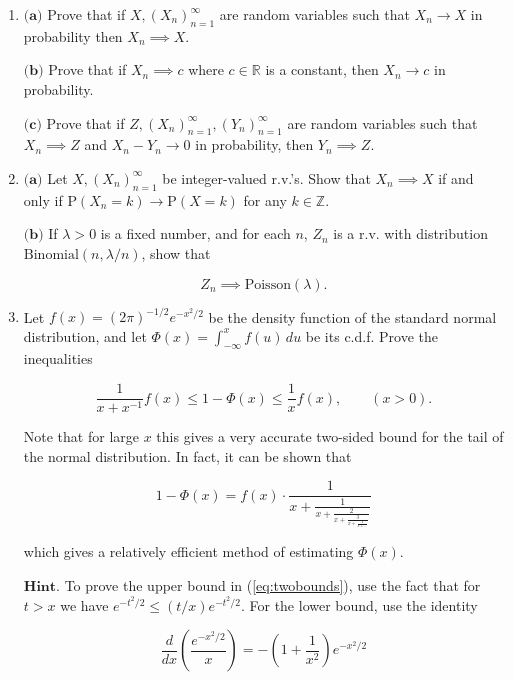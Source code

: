 \documentclass[11pt]{report}
\newcommand{\R}{\mathbb{R}}
\newcommand{\Z}{\mathbb{Z}}
\theoremstyle{plain}
\theoremstyle{definition}
\begin{document}
\begin{enumerate}[label=\arabic*.]
\[
f_{\phi(U,V)}(w,z) = \frac{1}{|J_\phi(\phi^{-1}(w,z))|} f_{U,V}(\phi^{-1}(w,z))
\]

for the density of a transformed random $2$-d vector
to get the joint density of $W,Z$.

\item $\textbf{(a)}$ Prove that if $X, (X_n)_{n=1}^\infty$
are random variables such that $X_n \to X$ in
probability then $X_n \implies X$.

$\textbf{(b)}$ Prove that if $X_n \implies c$ where
$c\in \R$ is a constant, then $X_n \to c$ in
probability.

$\textbf{(c)}$ Prove that if
$Z, (X_n)_{n=1}^\infty, (Y_n)_{n=1}^\infty$ are
random variables such that $X_n \implies Z$ and
$X_n-Y_n\to 0$ in probability, then $Y_n \implies Z$.

\item $\textbf{(a)}$ Let $X, (X_n)_{n=1}^\infty$ be
integer-valued r.v.'s. Show that $X_n\implies X$ if
and only if $\mathrm{P}(X_n=k)\to \mathrm{P}(X=k)$
for any $k\in\Z$.

$\textbf{(b)}$ If $\lambda >0$ is a fixed number, and
for each $n$, $Z_n$ is a r.v. with distribution
$\textrm{Binomial}(n,\lambda/n)$, show that

\[
Z_n \implies \textrm{Poisson}(\lambda).
\]

\item Let $f(x) = (2\pi)^{-1/2} e^{-x^2/2}$ be the density
function of the standard normal distribution, and let
$\Phi(x) = \int_{-\infty}^x f(u)\,du$ be its c.d.f.
Prove the inequalities

\begin{equation*}
\tag{38}\label{eq:twobounds}
\frac{1}{x+x^{-1}}f(x) \le 1-\Phi(x) \le \frac{1}{x} f(x), \qquad (x>0).
\end{equation*}

Note that for large $x$ this gives a very accurate
two-sided bound for the tail of the normal
distribution. In fact, it can be shown that

\[
1-\Phi(x) = f(x) \cdot \frac{1}{x+\frac{1}{x+\frac{2}{x+\frac{3}{x+\frac{4}{x+\ldots}}}}}
\]

which gives a relatively efficient method of
estimating $\Phi(x)$.

$\textbf{Hint.}$ To prove the upper bound in
(\ref{eq:twobounds}), use the fact that for $t>x$ we have
$e^{-t^2/2} \le (t/x)e^{-t^2/2}$. For the lower
bound, use the identity

\[
\frac{d}{dx}\left(\frac{e^{-x^2/2}}{x}\right) = -\left(1+\frac{1}{x^2}\right) e^{-x^2/2}
\]


\end{enumerate}
\end{document}
